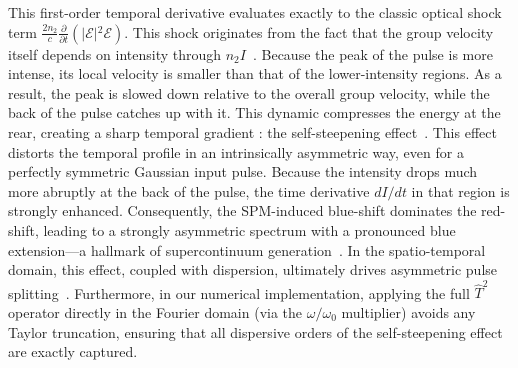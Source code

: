 This first-order temporal derivative evaluates exactly to the classic optical shock term $\frac{2n_2}{c} \frac{\partial}{\partial t} \left( \vert{}\mathcal{E}\vert{}^2 \mathcal{E} \right)$. This shock originates from the fact that the group velocity itself depends on intensity through $n_2 I$~\cite{rothenberg1992}. Because the peak of the pulse is more intense, its local velocity is smaller than that of the lower-intensity regions. As a result, the peak is slowed down relative to the overall group velocity, while the back of the pulse catches up with it. This dynamic compresses the energy at the rear, creating a sharp temporal gradient : the self-steepening effect~\cite{couairon2007}. This effect distorts the temporal profile in an intrinsically asymmetric way, even for a perfectly symmetric Gaussian input pulse. Because the intensity drops much more abruptly at the back of the pulse, the time derivative $dI/dt$ in that region is strongly enhanced. Consequently, the SPM-induced blue-shift dominates the red-shift, leading to a strongly asymmetric spectrum with a pronounced blue extension---a hallmark of supercontinuum generation~\cite{rothenberg1992,gaeta2000}. In the spatio-temporal domain, this effect, coupled with dispersion, ultimately drives asymmetric pulse splitting~\cite{couairon2007}. Furthermore, in our numerical implementation, applying the full $\hat{T}^{2}$ operator directly in the Fourier domain (via the $\omega/\omega_0$ multiplier) avoids any Taylor truncation, ensuring that all dispersive orders of the self-steepening effect are exactly captured.